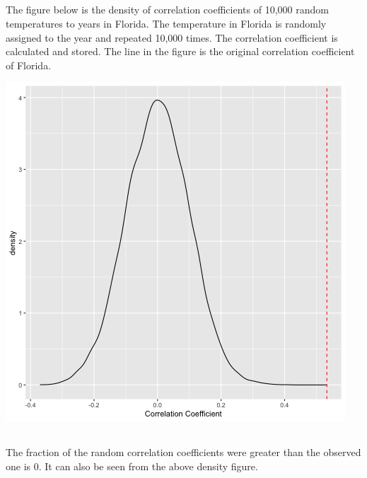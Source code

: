 \documentclass[a4paper, 11pt]{article}
\begin{document}
\subsection{}
The figure below is the density of correlation coefficients of 10,000 random temperatures to years in Florida. The temperature in Florida is randomly assigned to the year and repeated 10,000 times. The correlation coefficient is calculated and stored. The line in the figure is the original correlation coefficient of Florida.

\includegraphics[scale=0.35]{../data/random_ats_plot.png}

\subsection{}
The fraction of the random correlation coefficients were greater than the observed one is 0. It can also be seen from the above density figure.
\end{document}
